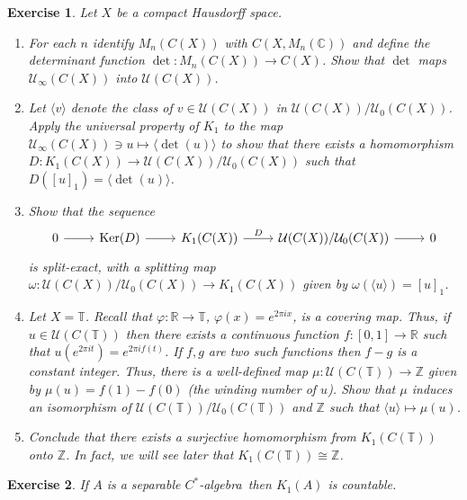 \documentclass{book}
\newtheorem{exercise}{Exercise}[section]
\def\cstar{\(C^*\)-algebra}
\begin{document}
\begin{exercise}\label{ex:734}
  Let \(X\) be a compact Hausdorff space.
  \begin{enumerate}
    \item For each \(n\) identify \(M_n(C(X))\) with \(C(X,M_n(\mathbb{C}))\) and define the \textnormal{determinant} function
    \(\det:M_n(C(X))\rightarrow C(X)\). Show that \(\det\) maps \(\mathcal{U}_\infty(C(X))\) into \(\mathcal{U}(C(X))\).
    \item Let \(\langle v\rangle\) denote the class of \(v\in\mathcal{U}(C(X))\) in \(\mathcal{U}(C(X))/\mathcal{U}_0(C(X))\).
    Apply the universal property of \(K_1\) to the map \(\mathcal{U}_\infty(C(X))\ni u\mapsto \langle\det(u)\rangle\) to show that there exists a homomorphism
    \(D:K_1(C(X))\rightarrow \mathcal{U}(C(X))/\mathcal{U}_0(C(X))\) such that \(D({[u]}_1)=\langle\det(u)\rangle\).
    \item Show that the sequence
    \[
      \begin{tikzcd}
      0\arrow[r]&\textnormal{Ker}(D) \arrow[r]&K_1(C(X)) \arrow[r,"D"]&\mathcal{U}(C(X))/\mathcal{U}_0(C(X))\arrow[r]&0
      \end{tikzcd}  
    \]
    is split-exact, with a splitting map \(\omega:\mathcal{U}(C(X))/\mathcal{U}_0(C(X))\rightarrow K_1(C(X))\)
    given by \(\omega(\langle u\rangle)={[u]}_1\).
    \item Let \(X=\mathbb{T}\). Recall that \(\varphi:\mathbb{R}\rightarrow\mathbb{T}\), \(\varphi(x)=e^{2\pi ix}\), is a covering map.
    Thus, if \(u\in\mathcal{U}(C(\mathbb{T}))\) then there exists a continuous function \(f:[0,1]\rightarrow\mathbb{R}\)
    such that \(u(e^{2\pi it})=e^{2\pi if(t)}\). If \(f,g\) are two such functions then \(f-g\) is a constant integer.
    Thus, there is a well-defined map \(\mu:\mathcal{U}(C(\mathbb{T}))\rightarrow\mathbb{Z}\) given by \(\mu(u)=f(1)-f(0)\)
    (the \textnormal{winding number} of \(u\)). Show that \(\mu\) induces an isomorphism of \(\mathcal{U}(C(\mathbb{T}))/\mathcal{U}_0(C(\mathbb{T}))\)
    and \(\mathbb{Z}\) such that \(\langle u\rangle\mapsto\mu(u)\).
    \item Conclude that there exists a surjective homomorphism from \(K_1(C(\mathbb{T}))\) onto \(\mathbb{Z}\).
    In fact, we will see later that \(K_1(C(\mathbb{T}))\cong\mathbb{Z}\).
  \end{enumerate}
\end{exercise}

\begin{exercise}\label{ex:735}
  If \(A\) is a separable \cstar\ then \(K_1(A)\) is countable.
\end{exercise}
\end{document}
